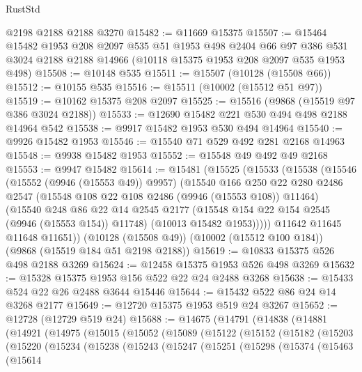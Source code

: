 \begin{lexlean}{RustStd}
\begin{coremodule}
    @2198
    @2188
    @2188
    @3270
@15482 := @11669 @15375
@15507 := @15464
    @15482
    @1953
    @208
    @2097
    @535
    @51
    @1953
    @498
    @2404
    @66
    @97
    @386
    @531
    @3024
    @2188
    @2188
    @14966
    (@10118 @15375 @1953 @208 @2097 @535 @1953 @498)
@15508 := @10148 @535
@15511 := @15507 (@10128 (@15508 @66))
@15512 := @10155 @535
@15516 := @15511 (@10002 (@15512 @51 @97))
@15519 := @10162 @15375 @208 @2097
@15525 := @15516 (@9868 (@15519 @97 @386 @3024 @2188))
@15533 := @12690 @15482 @221 @530 @494 @498 @2188 @14964 @542
@15538 := @9917 @15482 @1953 @530 @494 @14964
@15540 := @9926 @15482 @1953
@15546 := @15540 @71 @529 @492 @281 @2168 @14963
@15548 := @9938 @15482 @1953
@15552 := @15548 @49 @492 @49 @2168
@15553 := @9947 @15482
@15614 := @15481
    (@15525
      (@15533
        (@15538
          (@15546
            (@15552 (@9946 (@15553 @49)) @9957)
            (@15540
              @166
              @250
              @22
              @280
              @2486
              @2547
              (@15548 @108 @22 @108 @2486 (@9946 (@15553 @108)) @11464)
              (@15540
                @248
                @86
                @22
                @14
                @2545
                @2177
                (@15548 @154 @22 @154 @2545 (@9946 (@15553 @154)) @11748)
                (@10013 @15482 @1953)))))
        @11642
        @11645
        @11648
        @11651))
    (@10128 (@15508 @49))
    (@10002 (@15512 @100 @184))
    (@9868 (@15519 @184 @51 @2198 @2188))
@15619 := @10833 @15375 @526 @498 @2188 @3269
@15624 := @12458 @15375 @1953 @526 @498 @3269
@15632 := @15328 @15375 @1953 @156 @522 @22 @24 @2488 @3268
@15638 := @15433 @524 @22 @26 @2488 @3644 @15446
@15644 := @15432 @522 @86 @24 @14 @3268 @2177
@15649 := @12720 @15375 @1953 @519 @24 @3267
@15652 := @12728 (@12729 @519 @24)
@15688 := @14675
    (@14791
      (@14838
        (@14881
          (@14921
            (@14975
              (@15015
                (@15052
                  (@15089
                    (@15122
                      (@15152
                        (@15182
                          (@15203
                            (@15220
                              (@15234
                                (@15238
                                  (@15243
                                    (@15247
                                      (@15251
                                        (@15298
                                          (@15374
                                            (@15463
                                              (@15614

\end{coremodule}
\end{lexlean}
